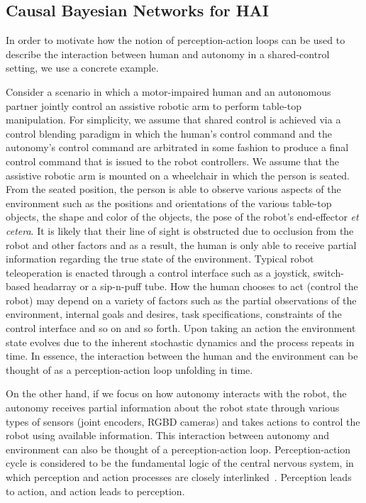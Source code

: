 \documentclass[12pt]{article}
\begin{document}
\subsection{Causal Bayesian Networks for HAI}

In order to motivate how the notion of perception-action loops can be used to describe the interaction between human and autonomy in a shared-control setting, we use a concrete example.

Consider a scenario in which a motor-impaired human and an autonomous partner jointly control an assistive robotic arm to perform table-top manipulation. For simplicity, we assume that shared control is achieved via a control blending paradigm in which the human's control command and the autonomy's control command are arbitrated in some fashion to produce a final control command that is issued to the robot controllers. We assume that the assistive robotic arm is mounted on a wheelchair in which the person is seated. From the seated position, the person is able to observe various aspects of the environment such as the positions and orientations of the various table-top objects, the shape and color of the objects, the pose of the robot's end-effector \textit{et cetera}. It is likely that their line of sight is obstructed due to occlusion from the robot and other factors and as a result, the human is only able to receive partial information regarding the true state of the environment. Typical robot teleoperation is enacted through a control interface such as a joystick, switch-based headarray or a sip-n-puff tube. How the human chooses to act (control the robot) may depend on a variety of factors such as the partial observations of the environment, internal goals and desires, task specifications, constraints of the control interface and so on and so forth. Upon taking an action the environment state evolves due to the inherent stochastic dynamics and the process repeats in time. In essence, the interaction between the human and the environment can be thought of as a perception-action loop unfolding in time. 

On the other hand, if we focus on how autonomy interacts with the robot, the autonomy receives partial information about the robot state through various types of sensors (joint encoders, RGBD cameras) and takes actions to control the robot using available information. This interaction between autonomy and environment can also be thought of a perception-action loop. Perception-action cycle is considered to be the fundamental logic of the central nervous system, in which perception and action processes are closely interlinked~\cite{cutsuridis2013cognitive}. Perception leads to action, and action leads to perception.
\end{document}
